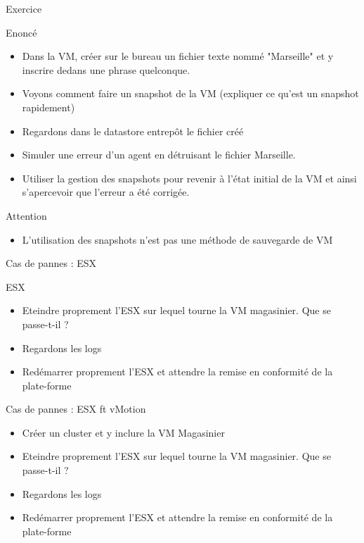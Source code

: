 \begin{frame}{Exercice}
\begin{block}{Enoncé}
\begin{itemize}
\item Dans la VM, créer sur le bureau un fichier texte nommé "Marseille" et y inscrire dedans une phrase quelconque.
\item Voyons comment faire un snapshot de la VM (expliquer ce qu'est un snapshot rapidement)
\item Regardons dans le datastore entrepôt le fichier créé
\item Simuler une erreur d'un agent en détruisant le fichier Marseille.
\item Utiliser la gestion des snapshots pour revenir à l'état initial de la VM et ainsi s'apercevoir que l'erreur a été corrigée.
\end{itemize}
\end{block}
\begin{alertblock}{Attention}
\begin{itemize}
\item L'utilisation des snapshots n'est pas une méthode de sauvegarde de VM
\end{itemize}
\end{alertblock}
\end{frame}

\begin{frame}{Cas de pannes : ESX}
\begin{block}{ESX}
\begin{itemize}
\item Eteindre proprement l'ESX sur lequel tourne la VM magasinier. Que se passe-t-il ?
\item Regardons les logs
\item Redémarrer proprement l'ESX et attendre la remise en conformité de la plate-forme
\end{itemize}
\end{block}

\begin{block}{Cas de pannes : ESX ft vMotion}
\begin{itemize}
\item Créer un cluster et y inclure la VM Magasinier
\item Eteindre proprement l'ESX sur lequel tourne la VM magasinier. Que se passe-t-il ?
\item Regardons les logs
\item Redémarrer proprement l'ESX et attendre la remise en conformité de la plate-forme
\end{itemize}
\end{block}
\end{frame}

